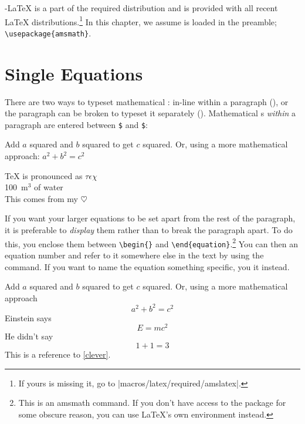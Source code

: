 \AmS-\LaTeX{} is a part of the required distribution and is provided
with all recent \LaTeX{} distributions.\footnote{If yours is missing it, go to
  \CTAN|macros/latex/required/amslatex|.} In this chapter, we assume
   is loaded in the preamble; \verb|\usepackage{amsmath}|.

\section{Single Equations}
  
There are two ways to typeset mathematical : in-line within a paragraph
(\emph{}), or the paragraph can be broken to 
typeset it separately (\textit{}). Mathematical s 
\emph{within} a paragraph are entered  %
between \texttt{\$} and \texttt{\$}:
\begin{example}
Add $a$ squared and $b$ squared
to get $c$ squared. Or, using 
a more mathematical approach:
$a^2 + b^2 = c^2$
\end{example}
\begin{example}
\TeX{} is pronounced as 
$\tau\epsilon\chi$\\[5pt]
100~m$^{3}$ of water\\[5pt]
This comes from my $\heartsuit$
\end{example}

If you want your larger equations to be set apart
from the rest of the paragraph, it is preferable to \emph{display} them
rather than to break the paragraph apart.
To do this, you enclose them between \verb|\begin{|\verb|}| and
\verb|\end{equation}|.\footnote{This is an \textsf{amsmath} command. If you don't
have access to the package for some obscure reason, you can use \LaTeX's own
 environment instead.} You can then  an equation number and refer to
it somewhere else in the text by using the  command. If you want to
name the equation something specific, you  it instead.
\begin{example}
Add $a$ squared and $b$ squared
to get $c$ squared. Or, using
a more mathematical approach
 \begin{equation}
   a^2 + b^2 = c^2
 \end{equation}
Einstein says
 \begin{equation}
   E = mc^2 \label{clever}
 \end{equation}
He didn't say
 \begin{equation}
  1 + 1 = 3 \tag{dumb}
 \end{equation}
This is a reference to 
\eqref{clever}. 
\end{example}

